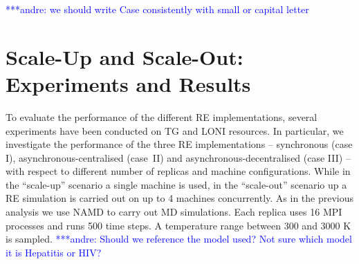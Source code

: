 \documentclass{rspublic}
\newcommand{\jhanote}[1]{ {\textcolor{red} { ***shantenu: #1 }}}
\newcommand{\alnote}[1]{ {\textcolor{blue} { ***andre: #1 }}}
\newcommand{\alnote}[1]{}
\newcommand{\jhanote}[1]{}
\begin{document}


\alnote{we should write Case consistently with small or capital letter}

\section{Scale-Up and Scale-Out: Experiments and Results}
\label{sec:performance}

To evaluate the performance of the different RE implementations, several 
experiments have been conducted on TG and LONI resources. In particular, 
we investigate the performance of the three RE implementations -- synchronous (case I),
asynchronous-centralised (case~II) and asynchronous-decentralised (case III) -- with
respect to different number of replicas and machine configurations.
While in the ``scale-up'' scenario a single machine is used, in the ``scale-out''
scenario up a RE simulation is carried out on up to 4 machines concurrently.
As in the previous analysis we use NAMD to carry out MD simulations. Each
replica uses 16 MPI processes and runs 500 time steps. A temperature range 
between 300 and 3000 K is sampled.
\alnote{Should we reference the model used? Not sure which model it is
Hepatitis or HIV?}
\end{document}
